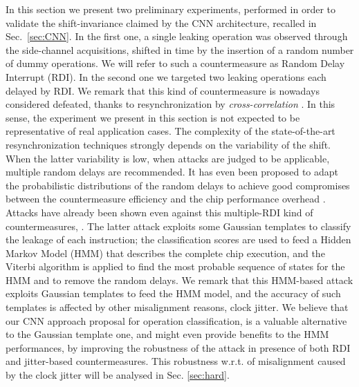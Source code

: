 In this section we present two preliminary  experiments, performed in order to validate the shift-invariance claimed by the CNN architecture, recalled in Sec.~\ref{sec:CNN}. In the first one, a single leaking operation was observed through the side-channel acquisitions, shifted in time by the insertion of a random number of dummy operations. We will refer to such a countermeasure as Random Delay Interrupt (RDI).  In the second one we targeted two leaking operations each delayed by RDI. We remark that this kind of countermeasure is nowadays considered defeated, \eg thanks to resynchronization by \emph{cross-correlation} \cite{nagashima2007dpa}. In this sense, the experiment we present in this section is not expected to be representative of real application cases. The complexity of the state-of-the-art resynchronization techniques strongly depends on the variability of the shift. When the latter variability is low, \ie when attacks are judged to be applicable, multiple random delays are recommended. It has even been proposed to adapt the probabilistic distributions of the random delays to achieve good compromises between the countermeasure efficiency and the chip performance overhead \cite{coron2009efficient,coron2010analysis}. Attacks have already been shown even against this multiple-RDI kind of countermeasures, \eg \cite{durvaux2012efficient}. The latter attack exploits some Gaussian templates to classify the leakage of each instruction; the classification scores are used to feed a Hidden Markov Model (HMM) that describes the complete chip execution, and the Viterbi algorithm is applied to find the most probable sequence of states for the HMM and to remove the random delays. We remark that this HMM-based attack exploits Gaussian templates to feed the HMM model, and the accuracy of such templates is affected by other misalignment reasons, \eg clock jitter. We believe that our  CNN approach proposal for operation classification, is a valuable alternative to  the Gaussian template one, and might even provide benefits to the HMM performances, by \eg improving the robustness of the attack in presence of both RDI and jitter-based countermeasures. This robustness w.r.t. of misalignment caused by the clock jitter will be analysed in Sec. \ref{sec:hard}.

